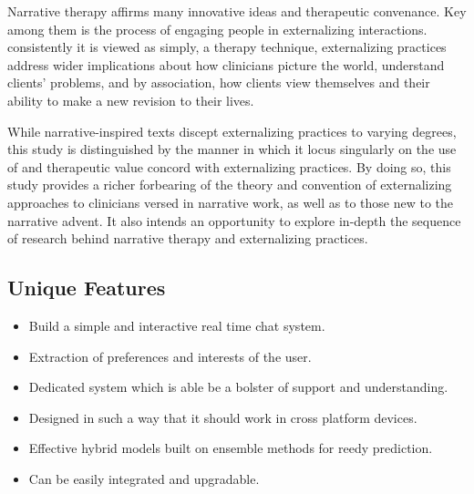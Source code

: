 \documentclass[conference,compsoc]{IEEEtran}
\begin{document}
Narrative therapy affirms many innovative ideas and therapeutic convenance. Key among them is the process of engaging people in externalizing interactions. consistently it is viewed as simply, a therapy technique, externalizing practices address wider implications about how clinicians picture the world, understand clients’ problems, and by association, how clients view themselves and their ability to make a new revision to their lives.

While narrative-inspired texts discept externalizing practices to varying degrees, this study is distinguished by the manner in which it locus singularly on the use of and therapeutic value concord with externalizing practices. By doing so, this study provides a richer forbearing of the theory and convention of externalizing approaches to clinicians versed in narrative work, as well as to those new to the narrative advent. It also intends an opportunity to explore in-depth the sequence of research behind narrative therapy and externalizing practices.

\subsection{Unique Features}
\begin{itemize}
    \item Build a simple and interactive real time chat system.
    \item Extraction of preferences and interests of the user.
    \item Dedicated system which is able be a bolster of support and understanding.
    \item Designed in such a way that it should work in cross platform devices.
    \item Effective hybrid models built on ensemble methods for reedy prediction.
    \item Can be easily integrated and upgradable.
\end{itemize}
\end{document}
